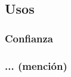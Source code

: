 \documentclass[../main.tex]{subfiles}
\begin{document}
\subsection{Usos}
\subsubsection{Confianza}
\subsubsection{... (mención)}
\end{document}
